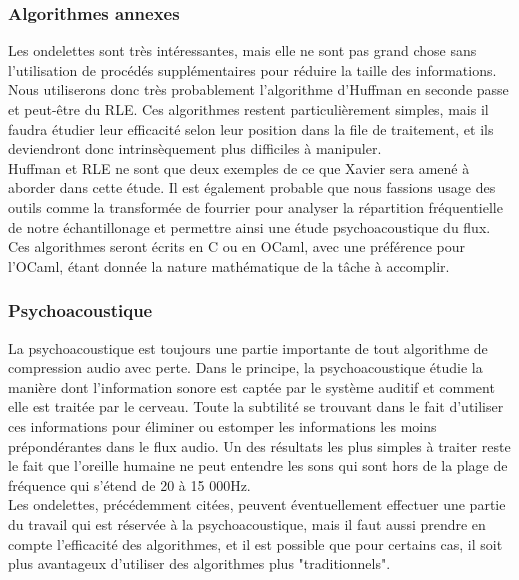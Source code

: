 		\subsubsection{Algorithmes annexes}
Les ondelettes  sont très  intéressantes,  mais elle  ne sont  pas grand
chose  sans l'utilisation  de procédés  supplémentaires pour  réduire la
taille  des  informations.   Nous  utiliserons  donc  très  probablement
l'algorithme  d'Huffman  en  seconde  passe  et  peut-être  du RLE.  Ces
algorithmes  restent particulièrement  simples,  mais il  faudra étudier
leur efficacité selon leur position  dans la file de traitement,  et ils
deviendront donc intrinsèquement plus difficiles à manipuler.\\
Huffman et RLE ne  sont que deux exemples de ce que  Xavier sera amené à
aborder dans cette  étude.  Il est également probable  que nous fassions
usage des outils  comme  la  transformée  de  fourrier  pour analyser la
répartition fréquentielle de notre échantillonage et permettre ainsi une
étude psychoacoustique du flux.\\
Ces algorithmes seront écrits en C ou en OCaml, avec une préférence pour
l'OCaml, étant donnée la nature mathématique de la tâche à accomplir.

		\subsubsection{Psychoacoustique}
La  psychoacoustique   est  toujours  une  partie   importante  de  tout
algorithme  de  compression  audio  avec  perte.  Dans  le principe,  la
psychoacoustique étudie la manière  dont l'information sonore est captée
par le système  auditif  et  comment  elle  est  traitée par le cerveau.
Toute la subtilité se trouvant  dans le fait d'utiliser ces informations
pour éliminer ou estomper les informations les moins prépondérantes dans
le flux  audio.  Un des résultats les  plus simples  à traiter  reste le
fait que l'oreille humaine ne peut entendre les sons qui sont hors de la
plage de fréquence qui s'étend de 20 à 15 000Hz.\\
Les ondelettes,  précédemment  citées,  peuvent éventuellement effectuer
une partie du  travail qui est réservée à  la psychoacoustique,  mais il
faut aussi  prendre en compte  l'efficacité des algorithmes,  et  il est
possible que pour certains cas,  il  soit plus avantageux d'utiliser des
algorithmes plus "traditionnels".

